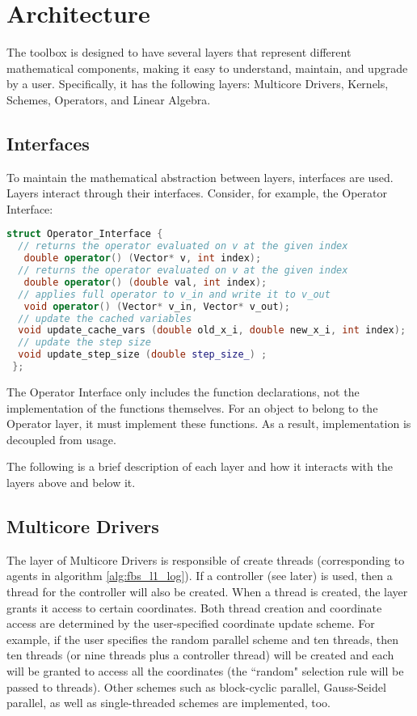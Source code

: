 \section{Architecture}

The toolbox is designed to have several layers that represent different mathematical components, making it easy to understand, maintain, and upgrade by a user. Specifically, it has the following layers: Multicore Drivers, Kernels, Schemes, Operators, and Linear Algebra. 

\subsection{Interfaces}
To maintain the mathematical abstraction between layers, interfaces are used. Layers interact through their interfaces.
Consider, for example,  the Operator Interface:

\begin{lstlisting}[language=C++,label={Operator_Interface}]
struct Operator_Interface {
  // returns the operator evaluated on v at the given index
   double operator() (Vector* v, int index);
  // returns the operator evaluated on v at the given index
   double operator() (double val, int index);
  // applies full operator to v_in and write it to v_out
   void operator() (Vector* v_in, Vector* v_out);
  // update the cached variables
  void update_cache_vars (double old_x_i, double new_x_i, int index);
  // update the step size
  void update_step_size (double step_size_) ;
 };
\end{lstlisting}

The Operator Interface only includes the function declarations, not the implementation of the functions themselves. For an object to belong to the Operator layer, it must implement these functions.
As a result, implementation is decoupled from usage.

The following is a brief description of each layer and how it interacts with the layers above and below it.

\subsection{Multicore Drivers}
The layer of Multicore Drivers is responsible of create threads (corresponding to agents in algorithm \ref{alg:fbs_l1_log}). If a controller (see later) is used, then a thread for the controller will also be created. When a thread is created, the layer grants it access to certain coordinates. Both thread creation and coordinate access are determined by the user-specified coordinate update scheme. For example, if the user specifies the random parallel scheme and ten threads, then ten threads (or nine threads plus a controller thread) will be created and each will  be granted to access all the coordinates (the ``random" selection rule will be passed to threads). Other schemes such as block-cyclic parallel, Gauss-Seidel parallel, as well as single-threaded schemes are implemented, too. 

